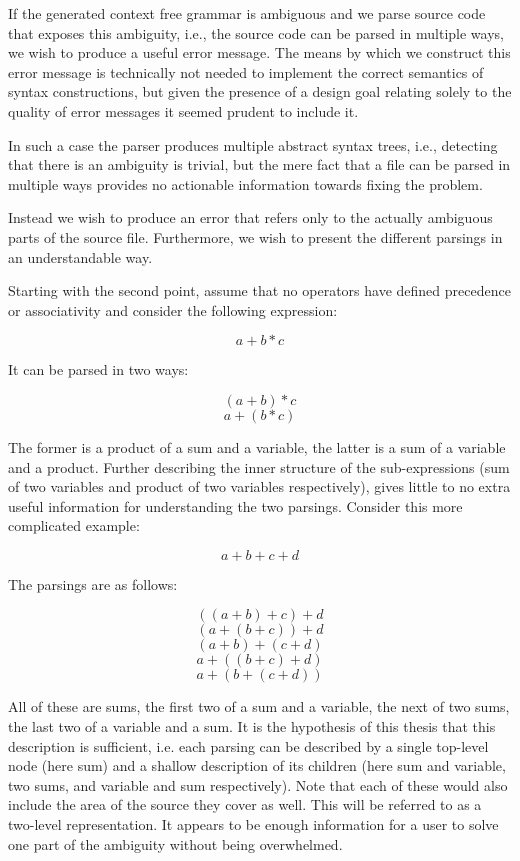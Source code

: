 \documentclass{kththesis}
\begin{document}
If the generated context free grammar is ambiguous and we parse source code that exposes this ambiguity, i.e., the source code can be parsed in multiple ways, we wish to produce a useful error message. The means by which we construct this error message is technically not needed to implement the correct semantics of syntax constructions, but given the presence of a design goal relating solely to the quality of error messages it seemed prudent to include it.

In such a case the parser produces multiple abstract syntax trees, i.e., detecting that there is an ambiguity is trivial, but the mere fact that a file can be parsed in multiple ways provides no actionable information towards fixing the problem.

Instead we wish to produce an error that refers only to the actually ambiguous parts of the source file. Furthermore, we wish to present the different parsings in an understandable way.

Starting with the second point, assume that no operators have defined precedence or associativity and consider the following expression:

$$ a + b * c $$

It can be parsed in two ways:

$$ (a + b) * c $$
$$ a + (b * c) $$

The former is a product of a sum and a variable, the latter is a sum of a variable and a product. Further describing the inner structure of the sub-expressions (sum of two variables and product of two variables respectively), gives little to no extra useful information for understanding the two parsings. Consider this more complicated example:

$$ a + b + c + d $$

The parsings are as follows:

$$ ((a + b) + c) + d $$
$$ (a + (b + c)) + d $$
$$ (a + b) + (c + d) $$
$$ a + ((b + c) + d) $$
$$ a + (b + (c + d)) $$

All of these are sums, the first two of a sum and a variable, the next of two sums, the last two of a variable and a sum. It is the hypothesis of this thesis that this description is sufficient, i.e. each parsing can be described by a single top-level node (here sum) and a shallow description of its children (here sum and variable, two sums, and variable and sum respectively). Note that each of these would also include the area of the source they cover as well. This will be referred to as a two-level representation. It appears to be enough information for a user to solve one part of the ambiguity without being overwhelmed.
\end{document}
